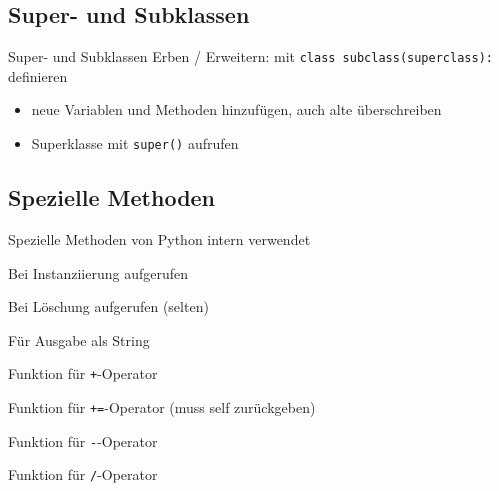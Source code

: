 \subsection{Super- und Subklassen}
\begin{frame}{Super- und Subklassen}
	Erben / Erweitern: mit \alert{\tt class subclass(superclass):} definieren
	\begin{itemize}
		\item neue Variablen und Methoden hinzufügen, auch alte überschreiben
		\item Superklasse mit \alert{\tt super()} aufrufen
	\end{itemize}
	
\end{frame}
\subsection{Spezielle Methoden}
\begin{frame}{Spezielle Methoden}
	von Python intern verwendet

	\begin{description}
		\item<1->[\tt\_\_init\_\_] Bei Instanziierung aufgerufen
		\item<2->[\tt\_\_del\_\_] Bei Löschung aufgerufen (selten)
		\item<3->[\tt\_\_str\_\_] Für Ausgabe als String
		\item<4->[\tt\_\_add\_\_] Funktion für \alert{\tt +}-Operator
		\item<5->[\tt\_\_iadd\_\_] Funktion für \alert{\tt +=}-Operator (muss self zurückgeben)
		\item<6->[\tt\_\_sub\_\_] Funktion für \alert{\tt -}-Operator
		\item<7->[\tt\_\_truediv\_\_] Funktion für \alert{\tt /}-Operator
	\end{description}
\end{frame}



